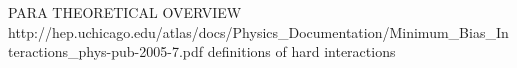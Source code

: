 \begin{comment}

The
Z
+jet sample
The Z
(
→
μμ
)
+jet and Z
(
→
ee
)
+jet samples are collected using single-lepton HLTs with various
p
T
thresholds. Events are required to contain either two opposite-sign muons or two opposite-
sign electrons, fulfilling standard tight isolation and identification requirements [29, 30], with
|
η
|
<
2.3 and
p
T
>
20 GeV.  The dilepton
(
``
)
system is required to have
p
T,
ll
>
30 GeV and
|
m
ll
−
m
Z
|
<
20 GeV,  where
m
Z
is the mass of the Z boson.   The leading jet in the event is
required to have
|
η
|
<
1.3 and
p
T
>
12 GeV,  and to have a large angular separation in the
(
x
,
y
)
plane  with  respect  to  the  dilepton  system,
|
∆
φ
(
Z, 1st  jet
)
|
>
2.8.   Events  are  rejected
if there is any second jet with
p
T, 2nd jet
>
5 GeV not fulfilling the condition
p
T,2nd jet
/
p
T,Z
=
α
<
0.3.  The value of the cut on
|
∆
φ
(
Z, 1st jet
)
|
is such that it does not bias the distribution
of
α
for
α
<
0.3.  As will be explained in Section 6.3, the requirement on
α
is tightened from
the nominal value of 0.3 and the results are studied as a function of its value.   In the Z
(
→
ee
)
+jet analysis an additional requirement is enforced that no electron in the event lie within
∆
R
=
√
(
∆
φ
)
2
+ (
∆
η
)
2
=
0.5 of a jet.  The Z+jet selection is also used in Section 7.4, with the
additional requirement that the jet is tagged as coming from a b quark using the combined
secondary vertex tagger [31], with a typical tagging efficiency of 70%
probability for light-flavor jets of 1%

https://arxiv.org/pdf/1607.03663.pdf

\end{comment}

\begin{comment} PHOTOS y EVTGEN
https://twiki.cern.ch/twiki/bin/view/CMSPublic/SWGuidePhotosInterface
Photos is a precision MC program which simulates QED interference and the imission of photon radiaiton.
https://evtgen.hepforge.org/
EvtGen is a Monte Carlo event generator that simulates the decays of heavy flavour particles, primarily B and D mesons. It contains a range of decay models for intermediate and final states containing scalar, vector and tensor mesons or resonances, as well as leptons, photons and baryons. Decay amplitudes are used to generate each branch of a given full decay tree, taking into account angular and time-dependent correlations which allows for the simulation of CP-violating processes.
\end{comment}


PARA THEORETICAL OVERVIEW
http://hep.uchicago.edu/atlas/docs/Physics_Documentation/Minimum_Bias_Interactions_phys-pub-2005-7.pdf
definitions of hard interactions
